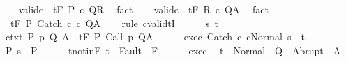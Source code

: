 \begin{isabellebody}
\ \ \isamarkupfalse%
\ valid{\isacharunderscore}c{}{\isacharcolon}\ {\isachardoublequoteopen}{\isasymGamma}{\isacharcomma}{\isasymTheta}\ {\isasymTurnstile}\isactrlsub t\isactrlbsub {\isacharslash}F\isactrlesub \ P\ c\ Q{\isacharcomma}R{\isachardoublequoteclose}\ \isamarkupfalse%
\ fact\isanewline
\ \ \isamarkupfalse%
\ valid{\isacharunderscore}c{}{\isacharcolon}\ {\isachardoublequoteopen}{\isasymGamma}{\isacharcomma}{\isasymTheta}\ {\isasymTurnstile}\isactrlsub t\isactrlbsub {\isacharslash}F\isactrlesub \ R\ c\ Q{\isacharcomma}A{\isachardoublequoteclose}\ \isamarkupfalse%
\ fact\isanewline
\ \ \isamarkupfalse%
\ {\isachardoublequoteopen}{\isasymGamma}{\isacharcomma}{\isasymTheta}\ {\isasymTurnstile}\isactrlsub t\isactrlbsub {\isacharslash}F\isactrlesub \ P\ Catch\ c\ c\ Q{\isacharcomma}A{\isachardoublequoteclose}\isanewline
\ \ \isamarkupfalse%
\ {\isacharparenleft}rule\ cvalidtI{\isacharparenright}\isanewline
\ \ \ \ \isamarkupfalse%
\ s\ t\isanewline
\ \ \ \ \isamarkupfalse%
\ ctxt{\isacharcolon}\ {\isachardoublequoteopen}{\isasymforall}{\isacharparenleft}P{\isacharcomma}\ p{\isacharcomma}\ Q{\isacharcomma}\ A{\isacharparenright}{\isasymin}{\isasymTheta}{\isachardot}\ {\isasymGamma}\ {\isasymTurnstile}\isactrlsub t\isactrlbsub {\isacharslash}F\isactrlesub \ P\ {\isacharparenleft}Call\ p{\isacharparenright}\ Q{\isacharcomma}A{\isachardoublequoteclose}\isanewline
\ \ \ \ \isamarkupfalse%
\ exec{\isacharcolon}\ {\isachardoublequoteopen}{\isasymGamma}{\isasymturnstile}{\isasymlangle}Catch\ c\ cNormal\ s{\isasymrangle}\ {\isasymRightarrow}\ t{\isachardoublequoteclose}\ \isanewline
\ \ \ \ \isamarkupfalse%
\ P{\isacharcolon}\ {\isachardoublequoteopen}s\ {\isasymin}\ P{\isachardoublequoteclose}\isanewline
\ \ \ \ \isamarkupfalse%
\ t{\isacharunderscore}notin{\isacharunderscore}F{\isacharcolon}\ {\isachardoublequoteopen}t\ {\isasymnotin}\ Fault\ {\isacharbackquote}\ F{\isachardoublequoteclose}\isanewline
\ \ \ \ \isamarkupfalse%
\ exec\ \isamarkupfalse%
\ {\isachardoublequoteopen}t\ {\isasymin}\ Normal\ {\isacharbackquote}\ Q\ {\isasymunion}\ Abrupt\ {\isacharbackquote}\ A{\isachardoublequoteclose}\isanewline
\ \ \ \ \isamarkupfalse%

\end{isabellebody}
